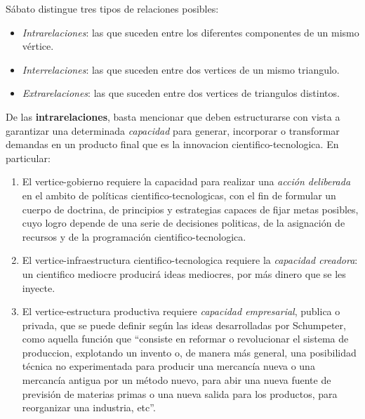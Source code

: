Sábato distingue tres tipos de relaciones posibles:

\begin{itemize}
    \item \textit{Intrarelaciones}: las que suceden entre los diferentes componentes de un mismo vértice.
    \item \textit{Interrelaciones}: las que suceden entre dos vertices de un mismo triangulo.
    \item \textit{Extrarelaciones}: las que suceden entre dos vertices de triangulos distintos.
\end{itemize}

De las \textbf{intrarelaciones}, basta mencionar que deben estructurarse con vista a garantizar una determinada \textit{capacidad} para generar, incorporar o transformar demandas en un producto final que es la innovacion cientifico-tecnologica. En particular:


\begin{enumerate}
    \item El vertice-gobierno requiere la capacidad para realizar una \textit{acción deliberada} en el ambito de políticas cientifico-tecnologicas, con el fin de formular un cuerpo de doctrina, de principios y estrategias capaces de fijar metas posibles, cuyo logro depende de una serie de decisiones politicas, de la asignación de recursos y de la programación cientifico-tecnologica.
    \item El vertice-infraestructura cientifico-tecnologica requiere la \textit{capacidad creadora}: un cientifico mediocre producirá ideas mediocres, por más dinero que se les inyecte.
    \item El vertice-estructura productiva requiere \textit{capacidad empresarial}, publica o privada, que se puede definir según las ideas desarrolladas por Schumpeter, como aquella función que ``consiste en reformar o revolucionar el sistema de produccion, explotando un invento o, de manera más general, una posibilidad técnica no experimentada para producir una mercancía nueva o una mercancía antigua por un método nuevo, para abir una nueva fuente de previsión de materias primas o una nueva salida para los productos, para reorganizar una industria, etc''.
\end{enumerate}

